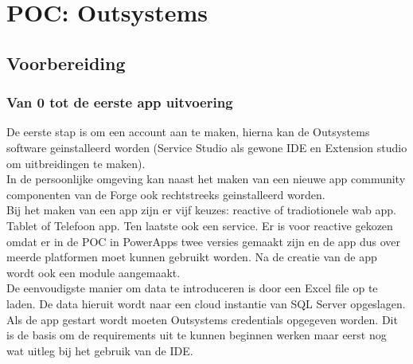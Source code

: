 
\chapter{POC: Outsystems}
\label{ch:outsystems-poc}



\section{Voorbereiding}

\subsection{Van 0 tot de eerste app uitvoering}

De eerste stap is om een account aan te maken, hierna kan de Outsystems software geinstalleerd worden (Service Studio als gewone IDE en Extension studio om uitbreidingen te maken).\\
In de persoonlijke omgeving kan naast het maken van een nieuwe app community componenten van de Forge ook rechtstreeks geinstalleerd worden. \\
Bij het maken van een app zijn er vijf keuzes: reactive of tradiotionele wab app. Tablet of Telefoon app. Ten laatste ook een service. Er is voor reactive gekozen omdat er in de POC in PowerApps twee versies gemaakt zijn en de app dus over meerde platformen moet kunnen gebruikt worden. Na de creatie van de app wordt ook een module aangemaakt.\\
De eenvoudigste manier om data te introduceren is door een Excel file op te laden. De data hieruit wordt naar een cloud instantie van SQL Server opgeslagen.\\
Als de app gestart wordt moeten Outsystems credentials opgegeven worden.
Dit is de basis om de requirements uit te kunnen beginnen werken maar eerst nog wat uitleg bij het gebruik van de IDE.

